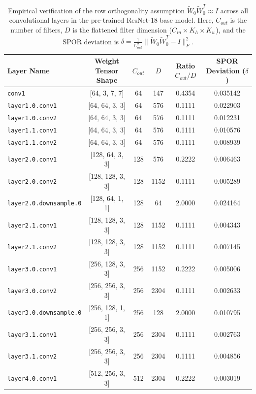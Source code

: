 \documentclass{article}
\theoremstyle{plain}
\theoremstyle{definition}
\theoremstyle{remark}
\begin{document}
\begin{table}[h]
\caption{Empirical verification of the row orthogonality assumption $\tilde{W}_0 \tilde{W}_0^T \approx I$ across all convolutional layers in the pre-trained ResNet-18 base model. Here, $C_{out}$ is the number of filters, $D$ is the flattened filter dimension ($C_{in} \times K_h \times K_w$), and the SPOR deviation is $\delta = \frac{1}{C_{out}^2} \|\tilde{W}_0 \tilde{W}_0^T - I\|_F^2$.}
\label{table:empirical_validation}
\vskip 0.15in
\begin{center}
\begin{small}
\begin{tabular}{lccccc}
\toprule
Layer Name & Weight Tensor Shape & $C_{out}$ & $D$ & Ratio $C_{out}/D$ & SPOR Deviation ($\delta$) \\
\midrule
\texttt{conv1} & [64, 3, 7, 7] & 64 & 147 & 0.4354 & 0.035142 \\
\texttt{layer1.0.conv1} & [64, 64, 3, 3] & 64 & 576 & 0.1111 & 0.022903 \\
\texttt{layer1.0.conv2} & [64, 64, 3, 3] & 64 & 576 & 0.1111 & 0.012231 \\
\texttt{layer1.1.conv1} & [64, 64, 3, 3] & 64 & 576 & 0.1111 & 0.010576 \\
\texttt{layer1.1.conv2} & [64, 64, 3, 3] & 64 & 576 & 0.1111 & 0.008939 \\
\texttt{layer2.0.conv1} & [128, 64, 3, 3] & 128 & 576 & 0.2222 & 0.006463 \\
\texttt{layer2.0.conv2} & [128, 128, 3, 3] & 128 & 1152 & 0.1111 & 0.005289 \\
\texttt{layer2.0.downsample.0} & [128, 64, 1, 1] & 128 & 64 & 2.0000 & 0.024164 \\
\texttt{layer2.1.conv1} & [128, 128, 3, 3] & 128 & 1152 & 0.1111 & 0.004343 \\
\texttt{layer2.1.conv2} & [128, 128, 3, 3] & 128 & 1152 & 0.1111 & 0.007145 \\
\texttt{layer3.0.conv1} & [256, 128, 3, 3] & 256 & 1152 & 0.2222 & 0.005006 \\
\texttt{layer3.0.conv2} & [256, 256, 3, 3] & 256 & 2304 & 0.1111 & 0.002633 \\
\texttt{layer3.0.downsample.0} & [256, 128, 1, 1] & 256 & 128 & 2.0000 & 0.010795 \\
\texttt{layer3.1.conv1} & [256, 256, 3, 3] & 256 & 2304 & 0.1111 & 0.002763 \\
\texttt{layer3.1.conv2} & [256, 256, 3, 3] & 256 & 2304 & 0.1111 & 0.004856 \\
\texttt{layer4.0.conv1} & [512, 256, 3, 3] & 512 & 2304 & 0.2222 & 0.003019 \\

\end{tabular}
\end{small}
\end{center}
\end{table}
\end{document}
